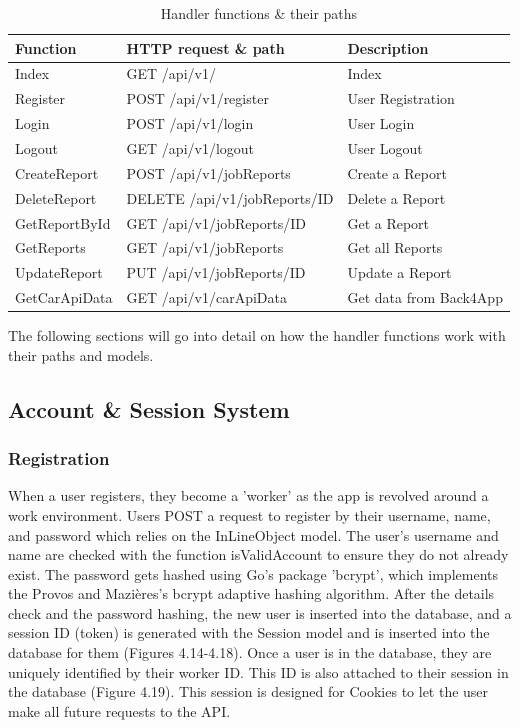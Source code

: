 \begin{table}[H]
\caption{Handler functions \& their paths}
\begin{tabular}{|l|l|l|}
\hline
Function      & HTTP request \& path         & Description            \\ \hline\hline
Index         & GET /api/v1/                 & Index                  \\ \hline
Register      & POST /api/v1/register        & User Registration      \\ \hline
Login         & POST /api/v1/login           & User Login             \\ \hline
Logout        & GET /api/v1/logout           & User Logout            \\ \hline
CreateReport  & POST /api/v1/jobReports      & Create a Report        \\ \hline
DeleteReport  & DELETE /api/v1/jobReports/ID & Delete a Report        \\ \hline
GetReportById & GET /api/v1/jobReports/ID    & Get a Report           \\ \hline
GetReports    & GET /api/v1/jobReports       & Get all Reports        \\ \hline
UpdateReport  & PUT /api/v1/jobReports/ID    & Update a Report        \\ \hline
GetCarApiData & GET /api/v1/carApiData       & Get data from Back4App \\
\hline
\end{tabular}
\end{table}

The following sections will go into detail on how the handler functions work with their paths and models.

\subsection{Account \& Session System}
\subsubsection{Registration}
When a user registers, they become a 'worker' as the app is revolved around a work environment. Users POST a request to register by their username, name, and password which relies on the InLineObject model. The user's username and name are checked with the function isValidAccount to ensure they do not already exist. The password gets hashed using Go's package 'bcrypt', which implements the Provos and Mazières's bcrypt adaptive hashing algorithm. \cite{ref25} After the details check and the password hashing, the new user is inserted into the database, and a session ID (token) is generated with the Session model and is inserted into the database for them (Figures 4.14-4.18). Once a user is in the database, they are uniquely identified by their worker ID. This ID is also attached to their session in the database (Figure 4.19). This session is designed for Cookies to let the user make all future requests to the API.


